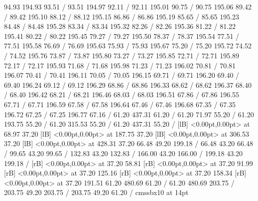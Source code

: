 { 94.93 194.93 93.51 /
 93.51 194.97 92.11 /
 92.11 195.01 90.75 /
 90.75 195.06 89.42 /
 89.42 195.10 88.12 /
 88.12 195.15 86.86 /
 86.86 195.19 85.65 /
 85.65 195.23 84.48 /
 84.48 195.28 83.34 /
 83.34 195.32 82.26 /
 82.26 195.36 81.22 /
 81.22 195.41 80.22 /
 80.22 195.45 79.27 /
 79.27 195.50 78.37 /
 78.37 195.54 77.51 /
 77.51 195.58 76.69 /
 76.69 195.63 75.93 /
 75.93 195.67 75.20 /
 75.20 195.72 74.52 /
 74.52 195.76 73.87 /
 73.87 195.80 73.27 /
 73.27 195.85 72.71 /
 72.71 195.89 72.17 /
 72.17 195.93 71.68 /
 71.68 195.98 71.23 /
 71.23 196.02 70.81 /
 70.81 196.07 70.41 /
 70.41 196.11 70.05 /
 70.05 196.15 69.71 /
 69.71 196.20 69.40 /
 69.40 196.24 69.12 /
 69.12 196.29 68.86 /
 68.86 196.33 68.62 /
 68.62 196.37 68.40 /
 68.40 196.42 68.21 /
 68.21 196.46 68.03 /
 68.03 196.51 67.86 /
 67.86 196.55 67.71 /
 67.71 196.59 67.58 /
 67.58 196.64 67.46 /
 67.46 196.68 67.35 /
 67.35 196.72 67.25 /
 67.25 196.77 67.16 /
\setsolid
{} 61.20 437.31 61.20 /
\setsolid
{} 61.20 71.97 55.20 /
\setsolid
{} 61.20 193.75 55.20 /
\setsolid
{} 61.20 315.53 55.20 /
\setsolid
{} 61.20 437.31 55.20 /
  [lB] <0.00pt,0.00pt> at 68.97 37.20
  [lB] <0.00pt,0.00pt> at 187.75 37.20
  [lB] <0.00pt,0.00pt> at 306.53 37.20
  [lB] <0.00pt,0.00pt> at 428.31 37.20
\setsolid
{} 66.48 49.20 199.18 /
\setsolid
{} 66.48 43.20 66.48 /
\setsolid
{} 99.65 43.20 99.65 /
\setsolid
{} 132.83 43.20 132.83 /
\setsolid
{} 166.00 43.20 166.00 /
\setsolid
{} 199.18 43.20 199.18 /
 [rB] <0.00pt,0.00pt> at 37.20 58.81
 [rB] <0.00pt,0.00pt> at 37.20 91.99
 [rB] <0.00pt,0.00pt> at 37.20 125.16
 [rB] <0.00pt,0.00pt> at 37.20 158.34
 [rB] <0.00pt,0.00pt> at 37.20 191.51
\setsolid
{} 61.20 480.69 61.20 /
 61.20 480.69 203.75 /
 203.75 49.20 203.75 /
 203.75 49.20 61.20 /
\font\picfont cmssbx10 at 14pt\picfont
}
